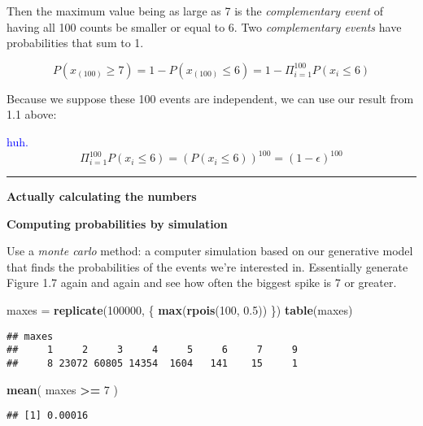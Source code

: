\documentclass[]{article}
\newenvironment{Shaded}{\begin{snugshade}}{\end{snugshade}}
\newcommand{\KeywordTok}[1]{\textcolor[rgb]{0.13,0.29,0.53}{\textbf{#1}}}
\newcommand{\DecValTok}[1]{\textcolor[rgb]{0.00,0.00,0.81}{#1}}
\newcommand{\FloatTok}[1]{\textcolor[rgb]{0.00,0.00,0.81}{#1}}
\newcommand{\StringTok}[1]{\textcolor[rgb]{0.31,0.60,0.02}{#1}}
\newcommand{\OperatorTok}[1]{\textcolor[rgb]{0.81,0.36,0.00}{\textbf{#1}}}
\newcommand{\NormalTok}[1]{#1}
\let\oldrule=\rule
\renewcommand{\rule}[1]{\oldrule{\linewidth}}
\begin{document}
Then the maximum value being as large as 7 is the \emph{complementary
event} of having all 100 counts be smaller or equal to 6. Two
\emph{complementary events} have probabilities that sum to 1.

\[P(x_{(100)}\geq 7)=1-P(x_{(100)} \leq 6)=1-
\Pi_{i=1}^{100} P(x_i \leq 6 )\]

Because we suppose these 100 events are independent, we can use our
result from 1.1 above:

\textcolor{blue}{huh.} \[
\Pi_{i=1}^{100} P(x_i \leq 6 ) = (P(x_i \leq 6))^{100} = (1- \epsilon)^{100}
\]

\begin{center}\rule{0.5\linewidth}{\linethickness}\end{center}

\textbf{Actually calculating the numbers}

\textbf{Computing probabilities by simulation}

Use a \emph{monte carlo} method: a computer simulation based on our
generative model that finds the probabilities of the events we're
interested in. Essentially generate Figure 1.7 again and again and see
how often the biggest spike is 7 or greater.

\begin{Shaded}
\begin{Highlighting}[]
\NormalTok{maxes =}\StringTok{ }\KeywordTok{replicate}\NormalTok{(}\DecValTok{100000}\NormalTok{, \{}
  \KeywordTok{max}\NormalTok{(}\KeywordTok{rpois}\NormalTok{(}\DecValTok{100}\NormalTok{, }\FloatTok{0.5}\NormalTok{))}
\NormalTok{\})}
\KeywordTok{table}\NormalTok{(maxes)}
\end{Highlighting}
\end{Shaded}

\begin{verbatim}
## maxes
##     1     2     3     4     5     6     7     9 
##     8 23072 60805 14354  1604   141    15     1
\end{verbatim}

\begin{Shaded}
\begin{Highlighting}[]
\KeywordTok{mean}\NormalTok{( maxes }\OperatorTok{>=}\StringTok{ }\DecValTok{7}\NormalTok{ )}
\end{Highlighting}
\end{Shaded}

\begin{verbatim}
## [1] 0.00016
\end{verbatim}
\end{document}
